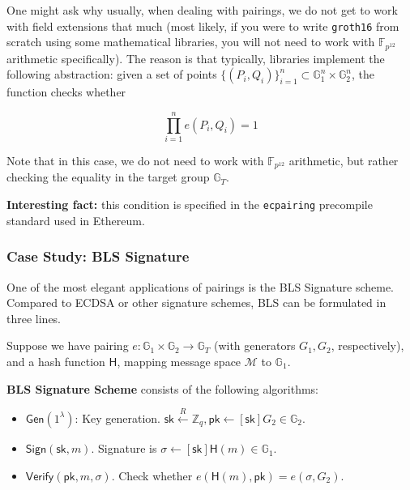 \documentclass[../lecture-notes.tex]{subfiles}
\begin{document}
\begin{remark}
    One might ask why usually, when dealing with pairings, we do not get to work with field extensions that much (most likely, if you were to write \texttt{groth16} from scratch using some mathematical libraries, you will not need to work with $\mathbb{F}_{p^{12}}$ arithmetic specifically). The reason is that typically, libraries implement the following abstraction: given a set of points $\{(P_i,Q_i)\}_{i=1}^n \subset \mathbb{G}_1^n \times \mathbb{G}_2^n$, the function checks whether

    \vspace{-1mm}

    \begin{equation*}
        \prod_{i=1}^n e(P_i,Q_i) = 1
    \end{equation*}

    \vspace{-1mm}

    Note that in this case, we do not need to work with $\mathbb{F}_{p^{12}}$ arithmetic, but rather checking the equality in the target group $\mathbb{G}_T$. 

    \textbf{Interesting fact:} this condition is specified in the \texttt{ecpairing} precompile standard used in Ethereum.
\end{remark}

\subsubsection{Case Study: BLS Signature}

One of the most elegant applications of pairings is the BLS Signature scheme. Compared to ECDSA or other signature schemes, BLS can be formulated in three lines.

Suppose we have pairing $e: \mathbb{G}_1 \times \mathbb{G}_2 \to \mathbb{G}_T$ (with generators $G_1,G_2$, respectively), and a hash function $\mathsf{H}$, mapping message space $\mathcal{M}$ to $\mathbb{G}_1$.
\begin{definition}
    \textbf{BLS Signature Scheme} consists of the following algorithms:
    \begin{itemize}
        \item $\mathsf{Gen}(1^{\lambda})$: Key generation. $\mathsf{sk} \xleftarrow[]{R} \mathbb{Z}_q, \mathsf{pk} \gets [\mathsf{sk}] G_2 \in \mathbb{G}_2$.
        \item $\mathsf{Sign}(\mathsf{sk},m)$. Signature is $\sigma \gets [\mathsf{sk}] \mathsf{H}(m) \in \mathbb{G}_1$.
        \item $\mathsf{Verify}(\mathsf{pk},m,\sigma)$. Check whether $e(\mathsf{H}(m), \mathsf{pk}) = e(\sigma, G_2)$.
    \end{itemize}
\end{definition}
        
\end{document}
